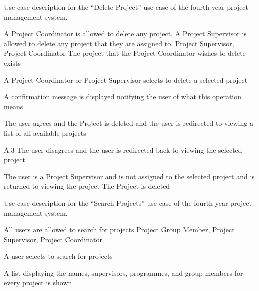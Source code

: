 \begin{table}
  \centering
  \caption{Use case description for the ``Delete Project'' use case of the fourth-year project management system.}
  \label{tbl:use-case-delete-project}

  \begin{usecase}
    A Project Coordinator is allowed to delete any project. A Project Supervisor is allowed to delete any project that they are assigned to.
    Project Supervisor, Project Coordinator
    The project that the Project Coordinator wishes to delete exists
    \ucnormal
    \begin{ucenum}
      \item A Project Coordinator or Project Supervisor selects to delete a selected project
      \item A confirmation message is displayed notifying the user of what this operation means
      \item The user agrees and the Project is deleted and the user is redirected to viewing a list of all available projects
    \end{ucenum}
    \begin{ucenum}
      \item [A.3] The user disagrees and the user is redirected back to viewing the selected project
    \end{ucenum}
    The user is a Project Supervisor and is not assigned to the selected project and is returned to viewing the project
    The Project is deleted
  \end{usecase}
\end{table}


\begin{table}
  \centering
  \caption{Use case description for the ``Search Projects'' use case of the fourth-year project management system.}
  \label{tbl:use-case-search-project}

  \begin{usecase}
    All users are allowed to search for projects
    Project Group Member, Project Supervisor, Project Coordinator
    \ucnormal
    \begin{ucenum}
      \item A user selects to search for projects
      \item A list displaying the names, supervisors, programmes, and group members for every project is shown
    \end{ucenum}
  \end{usecase}
\end{table}


